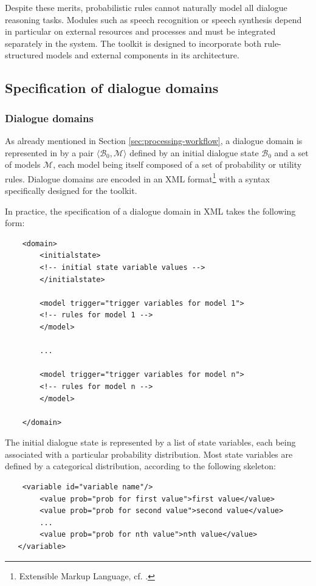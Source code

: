 Despite these merits, probabilistic rules cannot naturally model all dialogue reasoning tasks.  Modules such as speech recognition or speech synthesis depend in particular on external resources and processes and must be integrated separately in the system. The \opendial toolkit is designed to incorporate both rule-structured models and external components in its architecture. 
\subsection{Specification of dialogue domains}
\label{sec:domain-specification}

\subsubsection*{Dialogue domains}

As already mentioned in Section \ref{sec:processing-workflow}, a dialogue domain is represented in \opendial by a pair $\langle \mathcal{B}_0, \mathcal{M} \rangle$ defined by an initial dialogue state $\mathcal{B}_0$ and a set of models $\mathcal{M}$, each model being itself composed of a set of probability or utility rules. Dialogue domains are encoded in an XML format\footnote{Extensible Markup Language, cf. .} with a syntax specifically designed for the toolkit. 

In practice, the specification of a dialogue domain in XML takes the following form:
\lstset{language=XML}
\begin{lstlisting}
    <domain> 
        <initialstate>
		<!-- initial state variable values -->
        </initialstate>

        <model trigger="trigger variables for model 1">
   		<!-- rules for model 1 -->
     	</model>
     	
     	...
     	
     	<model trigger="trigger variables for model n">
   		<!-- rules for model n -->
     	</model>

    </domain>
\end{lstlisting}\vspace{2mm}

The initial dialogue state is represented by a list of state variables, each being associated with a particular probability distribution.  Most state variables are defined by a categorical distribution, according to the following skeleton:

\vspace{3mm}\begin{lstlisting}
    <variable id="variable name"/>
        <value prob="prob for first value">first value</value>
        <value prob="prob for second value">second value</value>
		...
        <value prob="prob for nth value">nth value</value>
   </variable>  
\end{lstlisting}\vspace{2mm}

